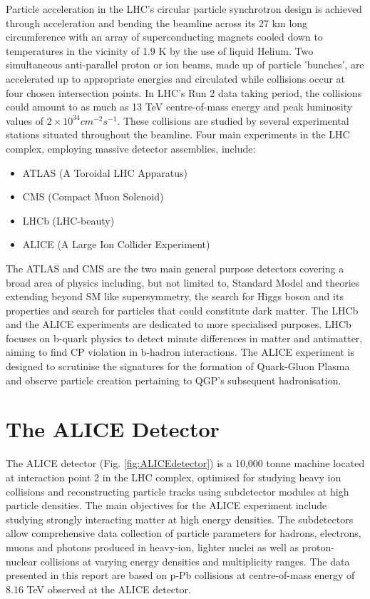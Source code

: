 Particle acceleration in the LHC's circular particle synchrotron design is achieved through acceleration and bending the beamline across its 27 km
long circumference with an array of superconducting magnets cooled down to temperatures in the vicinity of 1.9 K by the use of liquid Helium. Two
simultaneous anti-parallel proton or ion beams, made up of particle 'bunches', are accelerated up to appropriate energies and circulated while collisions
occur at four chosen intersection points. In LHC's Run 2 data taking period, the collisions could amount to as much as 13 TeV centre-of-mass energy and 
peak luminosity values of $2\times10^{34}cm^{-2}s^{-1}$\cite{LhcReport:2018}. These collisions are studied by several experimental stations situated 
throughout the beamline. Four main experiments in the LHC complex, employing massive detector assemblies, include:

\begin{itemize}
    \item ATLAS (A Toroidal LHC Apparatus)
    \item CMS (Compact Muon Solenoid)
    \item LHCb (LHC-beauty)
    \item ALICE (A Large Ion Collider Experiment)
\end{itemize}

The ATLAS and CMS are the two main general purpose detectors covering a broad area of physics including, but not limited to, Standard Model and theories
extending beyond SM like supersymmetry, the search for Higgs boson and its properties and search for particles that could constitute dark matter. The
LHCb and the ALICE experiments are dedicated to more specialised purposes. LHCb focuses on b-quark physics to detect minute differences in matter and
antimatter, aiming to find CP violation in b-hadron interactions. The ALICE experiment is designed to scrutinise the signatures for the formation of
Quark-Gluon Plasma and observe particle creation pertaining to QGP's subsequent hadronisation.

\section{The ALICE Detector}
The ALICE detector (Fig. \ref{fig:ALICEdetector}) is a 10,000 tonne machine located at interaction point 2 in the LHC complex, optimised for studying heavy ion collisions and
reconstructing particle tracks using subdetector modules at high particle densities. The main objectives for the ALICE experiment include studying
strongly interacting matter at high energy densities. The subdetectors allow comprehensive data collection of particle parameters for hadrons,
electrons, muons and photons produced in heavy-ion, lighter nuclei as well as proton-nuclear collisions at varying energy densities and multiplicity
ranges. The data presented in this report are based on p-Pb collisions at centre-of-mass energy of 8.16 TeV observed at the ALICE detector.


